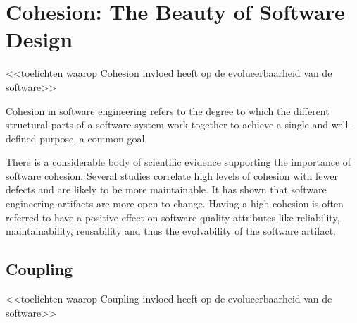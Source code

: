 \section{Cohesion: The Beauty of Software Design}
<<toelichten waarop Cohesion invloed heeft op de evolueerbaarheid van de software>>

Cohesion in software engineering refers to the degree to which the different structural
parts of a software system work together to achieve a single and well-defined purpose, a
common goal. 

There is a considerable body of scientific evidence supporting the importance of software
cohesion. Several studies correlate high levels of cohesion with fewer defects and are
likely to be more maintainable. It has shown that software engineering artifacts are more
open to change. Having a high cohesion is often referred to have a positive effect on
software quality attributes like reliability, maintainability, reusability and thus the
evolvability of the software artifact. 

\subsection{Coupling}
<<toelichten waarop Coupling invloed heeft op de evolueerbaarheid van de software>>